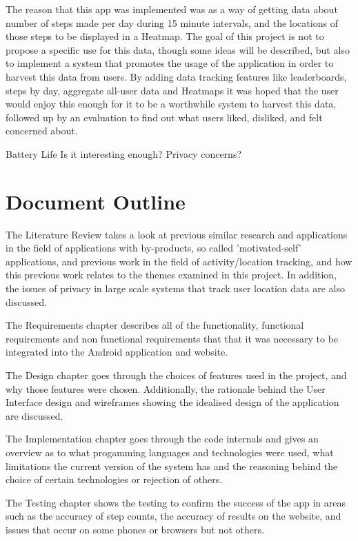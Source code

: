 \documentclass{l4proj}
\begin{document}
The reason that this app was implemented was as a way of getting data about number of steps made per day during 15 minute intervals, and the locations of those steps to be displayed in a Heatmap. The goal of this project is not to propose a specific use for this data, though some ideas will be described, but also to implement a system that promotes the usage of the application in order to harvest this data from users. By adding data tracking features like leaderboards, steps by day, aggregate all-user data and Heatmaps it was hoped that the user would enjoy this enough for it to be a worthwhile system to harvest this data, followed up by an evaluation to find out what users liked, disliked, and felt concerned about. 

Battery Life
Is it interesting enough?
Privacy concerns?

\section{Document Outline}

The Literature Review takes a look at previous similar research and applications in the field of applications with by-products, so called 'motivated-self' applications, and previous work in the field of activity/location tracking, and how this previous work relates to the themes examined in this project. In addition, the issues of privacy in large scale systems that track user location data are also discussed.

The Requirements chapter describes all of the functionality, functional requirements and non functional requirements that that it was necessary to be integrated into the Android application and website.

The Design chapter goes through the choices of features used in the project, and why those features were chosen. Additionally, the rationale behind the User Interface design and wireframes showing the idealised design of the application are discussed.

The Implementation chapter goes through the code internals and gives an overview as to what progamming languages and technologies were used, what limitations the current version of the system has and the reasoning behind the choice of certain technologies or rejection of others.

The Testing chapter shows the testing to confirm the success of the app in areas such as the accuracy of step counts, the accuracy of results on the website, and issues that occur on some phones or browsers but not others. 
\end{document}
